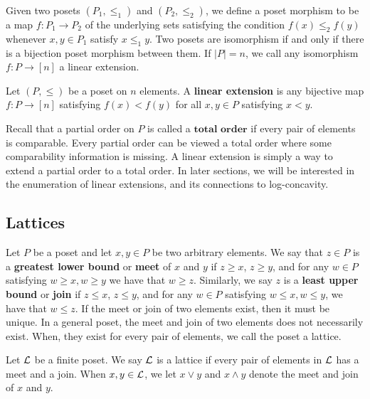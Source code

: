 \documentclass{puthesis-UG}
\begin{document}
Given two posets $(P_1, \leq_1)$ and $(P_2, \leq_2)$, we define a poset morphism to be a map $f : P_1 \to P_2$ of the underlying sets satisfying the condition $f(x) \leq_2 f(y)$ whenever $x, y \in P_1$ satisfy $x \leq_1 y$. Two posets are isomorphism if and only if there is a bijection poset morphism between them. If $|P| = n$, we call any isomorphism $f : P \to [n]$ a linear extension. 

\begin{defn} \label{defn:linear-extension}
	Let $(P, \leq)$ be a poset on $n$ elements. A \textbf{linear extension} is any bijective map $f : P \to [n]$ satisfying $f(x) < f(y)$ for all $x, y \in P$ satisfying $x < y$.
\end{defn}

Recall that a partial order on $P$ is called a $\textbf{total order}$ if every pair of elements is comparable. Every partial order can be viewed a total order where some comparability information is missing. A linear extension is simply a way to extend a partial order to a total order. In later sections, we will be interested in the enumeration of linear extensions, and its connections to log-concavity. 

\subsection{Lattices}

Let $P$ be a poset and let $x, y \in P$ be two arbitrary elements. We say that $z \in P$ is a \textbf{greatest lower bound} or \textbf{meet} of $x$ and $y$ if $z \geq x$, $z \geq y$, and for any $w \in P$ satisfying $w \geq x, w \geq y$ we have that $w \geq z$. Similarly, we say $z$ is a \textbf{least upper bound} or \textbf{join} if $z \leq x$, $z \leq y$, and for any $w \in P$ satisfying $w \leq x, w \leq y$, we have that $w \leq z$. If the meet or join of two elements exist, then it must be unique. In a general poset, the meet and join of two elements does not necessarily exist. When, they exist for every pair of elements, we call the poset a lattice. 

\begin{defn} \label{defn:lattice}
	Let $\mathcal{L}$ be a finite poset. We say $\mathcal{L}$ is a lattice if every pair of elements in $\mathcal{L}$ has a meet and a join. When $x, y \in \mathcal{L}$, we let $x \vee y$  and $x \wedge y$ denote the meet and join of $x$ and $y$. 
\end{defn}
\end{document}
